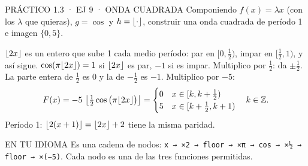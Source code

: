 \begin{enunciado}{PRÁCTICO 1.3 · EJ 9 · ONDA CUADRADA}
Componiendo $f(x)=\lambda x$ (con los $\lambda$ que quieras), $g=\cos$ y $h=\lfloor \cdot\rfloor$, construir una onda cuadrada de período 1 e imagen $\{0,5\}$.
\end{enunciado}
$\lfloor 2x\rfloor$ es un entero que sube 1 cada medio período: par en $[0,\frac12)$, impar en $[\frac12,1)$, y así sigue.
$\cos(\pi\lfloor 2x\rfloor)=1$ si $\lfloor 2x\rfloor$ es par, $-1$ si es impar.
Multiplico por $\frac12$: da $\pm\frac12$. La parte entera de $\frac12$ es 0 y la de $-\frac12$ es $-1$. Multiplico por $-5$:
\[F(x)=-5\,\left\lfloor\tfrac12\cos\big(\pi\lfloor 2x\rfloor\big)\right\rfloor=\begin{cases}0 & x\in[k,k+\frac12)\\ 5 & x\in[k+\frac12,k+1)\end{cases}\quad k\in\mathbb{Z}.\]
Período 1: $\lfloor 2(x+1)\rfloor=\lfloor 2x\rfloor+2$ tiene la misma paridad.\ok
\begin{tip}{EN TU IDIOMA}
Es una cadena de nodos: \texttt{x → ×2 → floor → ×π → cos → ×½ → floor → ×(−5)}. Cada nodo es una de las tres funciones permitidas.
\end{tip}
